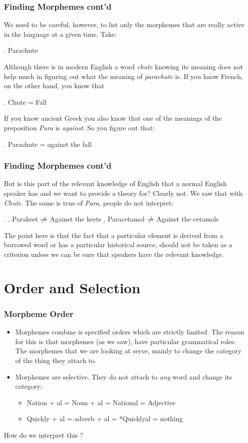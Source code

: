 \begin{frame}
\frametitle{Finding Morphemes cont'd}
  We need to be careful, however, to list only the morphemes that are really active in the language at a given time.  Take:

\ex.  Parachute

Although there is in modern English a word \textit{chute} knowing its meaning does not help much in figuring out what the meaning of \textit{parachute} is.  If you know French, on the other hand, you know that 

\ex.
Chute = Fall

If you know ancient Greek you also know that one of the meanings of the preposition \textit{Para} is \textit{against}.  So you figure out that:

\ex.
Parachute = against the fall


\end{frame}
\begin{frame}
\frametitle{Finding Morphemes cont'd}
  But is this part of the relevant knowledge of English that a normal English speaker has and we want to provide a theory for?
  Clearly not.  We saw that with \textit{Chute}.  The same is true of \textit{Para}, people do not interpret:

\ex.
\a. Parakeet $\centernot\rightarrow$ Against the keets
\b. Paracetamol $\centernot\rightarrow$ Against the cetamols

The point here is that the fact that a particular element is derived from a borrowed word or has a particular historical source, should not be taken as a criterion unless we can be sure that speakers have the relevant knowledge.
 
\end{frame}

\section{Order and Selection} 

\begin{frame}
  \frametitle{Morpheme Order}

\begin{itemize}
\item Morphemes combine is specified orders which are strictly limited.  The reason for this is that morphemes (as we saw), have particular grammatical roles.  The morphemes that we are looking at serve, mainly to change the category of the thing they attach to. \pause
\item Morphemes are selective.  They do not attach to \emph{any} word and change its category:
  \begin{itemize}
  \item Nation + al = Noun + al = National = Adjective
  \item Quickly + al = adverb + al = *Quicklyal = nothing 
  \end{itemize}
\end{itemize}
How do we interpret this ?

\end{frame}

